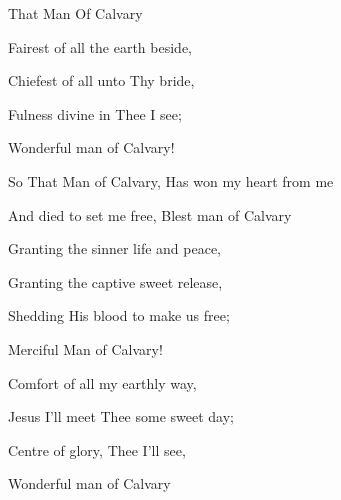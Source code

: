 \documentclass[12pt]{book}
\begin{document}
\begin{song}{That Man Of Calvary}{}
  {\SBPubDom}
  {}
  {}
  {}

  \begin{SBVerse}
    Fairest of all the earth beside,

    Chiefest of all unto Thy bride,

    Fulness divine in Thee I see;

    Wonderful man of Calvary!
  \end{SBVerse}

  \begin{SBOpGroup}
    So That Man of Calvary, Has won my heart from me

    And died to set me free, Blest man of Calvary
  \end{SBOpGroup}

  \begin{SBVerse}
    Granting the sinner life and peace,

    Granting the captive sweet release,

    Shedding His blood to make us free;

    Merciful Man of Calvary!
  \end{SBVerse}

  \begin{SBVerse}
    Comfort of all my earthly way,

    Jesus I'll meet Thee some sweet day;

    Centre of glory, Thee I'll see,

    Wonderful man of Calvary
  \end{SBVerse}
\end{song}
\end{document}
